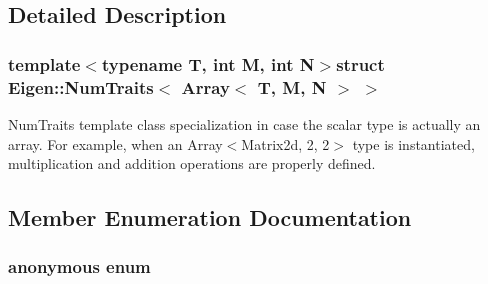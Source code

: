 \subsection{Detailed Description}
\subsubsection*{template$<$typename T, int M, int N$>$struct Eigen\-::\-Num\-Traits$<$ Array$<$ T, M, N $>$ $>$}

Num\-Traits template class specialization in case the scalar type is actually an array. For example, when an Array$<$\-Matrix2d, 2, 2$>$ type is instantiated, multiplication and addition operations are properly defined. 

\subsection{Member Enumeration Documentation}
\hypertarget{struct_eigen_1_1_num_traits_3_01_array_3_01_t_00_01_m_00_01_n_01_4_01_4_abc5c98fcc1211af2b80116dd6e0a035d}{\subsubsection[{anonymous enum}]{\setlength{\rightskip}{0pt plus 5cm}anonymous enum}}\label{struct_eigen_1_1_num_traits_3_01_array_3_01_t_00_01_m_00_01_n_01_4_01_4_abc5c98fcc1211af2b80116dd6e0a035d}
